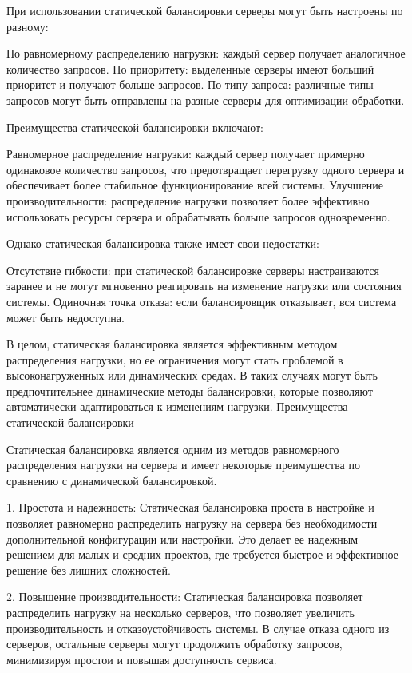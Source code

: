 При использовании статической балансировки серверы могут быть настроены по разному:

По равномерному распределению нагрузки: каждый сервер получает аналогичное количество запросов.
По приоритету: выделенные серверы имеют больший приоритет и получают больше запросов.
По типу запроса: различные типы запросов могут быть отправлены на разные серверы для оптимизации обработки.

Преимущества статической балансировки включают:

Равномерное распределение нагрузки: каждый сервер получает примерно одинаковое количество запросов, что предотвращает перегрузку одного сервера и обеспечивает более стабильное функционирование всей системы.
Улучшение производительности: распределение нагрузки позволяет более эффективно использовать ресурсы сервера и обрабатывать больше запросов одновременно.

Однако статическая балансировка также имеет свои недостатки:

Отсутствие гибкости: при статической балансировке серверы настраиваются заранее и не могут мгновенно реагировать на изменение нагрузки или состояния системы.
Одиночная точка отказа: если балансировщик отказывает, вся система может быть недоступна.

В целом, статическая балансировка является эффективным методом распределения нагрузки, но ее ограничения могут стать проблемой в высоконагруженных или динамических средах. В таких случаях могут быть предпочтительнее динамические методы балансировки, которые позволяют автоматически адаптироваться к изменениям нагрузки.
Преимущества статической балансировки

Статическая балансировка является одним из методов равномерного распределения нагрузки на сервера и имеет некоторые преимущества по сравнению с динамической балансировкой.

1. Простота и надежность: Статическая балансировка проста в настройке и позволяет равномерно распределить нагрузку на сервера без необходимости дополнительной конфигурации или настройки. Это делает ее надежным решением для малых и средних проектов, где требуется быстрое и эффективное решение без лишних сложностей.

2. Повышение производительности: Статическая балансировка позволяет распределить нагрузку на несколько серверов, что позволяет увеличить производительность и отказоустойчивость системы. В случае отказа одного из серверов, остальные серверы могут продолжить обработку запросов, минимизируя простои и повышая доступность сервиса.

